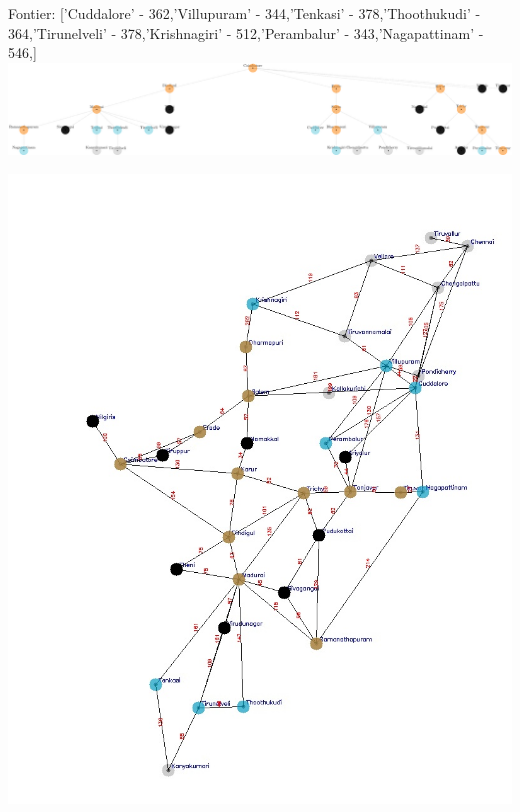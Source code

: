 \documentclass[xcolor=table]{beamer}
\begin{document}
\begin{frame}
  { \tiny Fontier: ['Cuddalore' - 362,'Villupuram' - 344,'Tenkasi' - 378,'Thoothukudi' - 364,'Tirunelveli' - 378,'Krishnagiri' - 512,'Perambalur' - 343,'Nagapattinam' - 546,]}
  \includegraphics[width=1\textwidth]{../UCSNodes/29-1.png}
  \begin{center}
    \includegraphics[height=0.55\textheight]{../UCSoutput/tamilUCS27.jpg}
  \end{center}
\end{frame}
\end{document}
